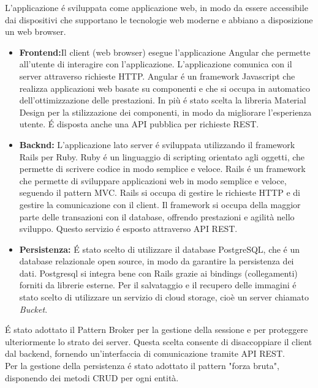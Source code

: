 L’applicazione é sviluppata come applicazione web, in modo da essere accessibile dai dispositivi che supportano le tecnologie web moderne e abbiano a disposizione un web browser.
\begin{itemize}
	\item \large{\textbf{Frontend:}}\newline Il client (web browser) esegue l'applicazione Angular che permette all'utente di interagire con l'applicazione. L'applicazione comunica con il server attraverso richieste HTTP. Angular é un framework Javascript che realizza applicazioni web basate su componenti e che si occupa in automatico dell'ottimizzazione delle prestazioni. In più é stato scelta la libreria Material Design per la stilizzazione dei componenti, in modo da migliorare l'esperienza utente. É disposta anche una API pubblica per richieste REST. 
	\item \large{\textbf{Backnd:}}\newline
	L'applicazione lato server é sviluppata utilizzando il framework Rails per Ruby. Ruby é un linguaggio di scripting orientato agli oggetti, che permette di scrivere codice in modo semplice e veloce. Rails é un framework che permette di sviluppare applicazioni web in modo semplice e veloce, seguendo il pattern MVC. Rails si occupa di gestire le richieste HTTP e di gestire la comunicazione con il client. Il framework si occupa della maggior parte delle transazioni con il database, offrendo prestazioni e agilità nello sviluppo. Questo servizio é esposto attraverso API REST.
	\item \large{\textbf{Persistenza:}}\newline
	É stato scelto di utilizzare il database PostgreSQL, che é un database relazionale open source, in modo da garantire la persistenza dei dati. Postgresql si integra bene con Rails grazie ai bindings (collegamenti) forniti da librerie esterne.
	Per il salvataggio e il recupero delle immagini é stato scelto di utilizzare un servizio di cloud storage, cioè un server chiamato \textit{Bucket}.
\end{itemize}

É stato adottato il Pattern Broker per la gestione della sessione e per proteggere ulteriormente lo strato dei server. Questa scelta consente di disaccoppiare il client dal backend, fornendo un'interfaccia di comunicazione tramite API REST.\\

Per la gestione della persistenza é stato adottato il pattern "forza bruta", disponendo dei metodi CRUD per ogni entità.\\

